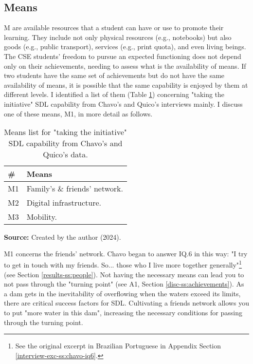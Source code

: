 \subsection{Means}
\label{disc-ss:means}

\gls{M} are available resources that a student can have or use to promote their learning. They include not only physical resources (e.g., notebooks) but also goods (e.g., public transport), services (e.g., print quota), and even living beings. The \gls{CSE} students' freedom to pursue an expected functioning does not depend only on their achievements, needing to assess what is the availability of means. If two students have the same set of achievements but do not have the same availability of means, it is possible that the same capability is enjoyed by them at different levels. I identified a list of them (Table \ref{tbl:means-list}) concerning "taking the initiative" \gls{SDL} capability from Chavo's and Quico's interviews mainly. I discuss one of these means, \gls{M}1, in more detail as follows.

\begin{table}[ht]
\caption{Means list for "taking the initiative" \acrshort{SDL} capability from Chavo's and Quico's data.}
\label{tbl:means-list}
\centering
{}
\begin{tabular}{p{0.5cm}p{5cm}}
\hline
\textbf{\#} &
\textbf{Means}\\
\hline     
M1 &
Family's \& friends' network.\\
M2 & 
Digital infrastructure. \\
M3 &
Mobility. \\
\hline

\end{tabular}
\par\medskip\ABNTEXfontereduzida\selectfont\textbf{Source:} Created by the author (2024). \par\medskip
\end{table}

\gls{M}1 concerns the friends' network. Chavo began to answer \gls{IQ}.6 in this way: "I try to get in touch with my friends. So... those who I live more together generally"\footnote{See the original excerpt in Brazilian Portuguese in Appendix Section \ref{interview-exc-ss:chavo-iq6}.} (see Section \ref{results-ss:people}). Not having the necessary means can lead you to not pass through the "turning point" (see \gls{A}1, Section \ref{disc-ss:achievements}). As a dam gets in the inevitability of overflowing when the waters exceed its limits, there are critical success factors for \gls{SDL}. Cultivating a friends network allows you to put "more water in this dam", increasing the necessary conditions for passing through the turning point.

